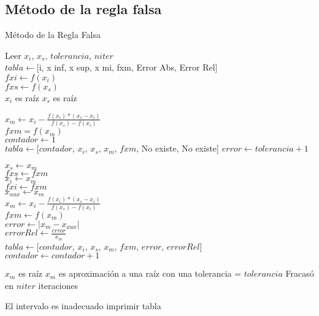 \documentclass[12pt]{article}
\begin{document}
\subsection{Método de la regla falsa}
\begin{algorithm}[H]
	\caption{Método de la Regla Falsa}
	\SetAlgoLined
	Leer $x_i$, $x_s$, $tolerancia$, $niter$ \\
	$tabla \leftarrow $[i, x inf, x sup, x mi, fxm, Error Abs, Error Rel] \\
	$fxi \leftarrow f(x_i)$ \\
	$fxs \leftarrow f(x_s)$ \\
	{$x_i$ es raíz}
	{$x_s$ es raíz}
	{
		$x_m \leftarrow x_i - \frac{f(x_i)*(x_s - x_i)}{f(x_s) - f(x_i)}$\\
		$fxm = f(x_m)$\\
		$contador \leftarrow 1$\\
		$tabla \leftarrow $[$contador$, $x_i$, $x_s$, $x_m$, $fxm$, No existe, No existe]
		$error \leftarrow tolerancia + 1$ \\
		{
			{$x_s \leftarrow x_m$\\
				$fxs \leftarrow fxm$\\}
			{$x_i \leftarrow x_m$\\
				$fxi \leftarrow fxm$\\}
			$x_{aux} \leftarrow x_m$\\
			$x_m \leftarrow x_i - \frac{f(x_i)*(x_s - x_i)}{f(x_s) - f(x_i)}$\\
			$fxm \leftarrow f(x_m)$\\
			$error \leftarrow |x_m - x_{aux}|$\\
			$error Rel \leftarrow \frac{error}{x_m}$\\
			$tabla \leftarrow $[$contador$, $x_i$, $x_s$, $x_m$, $fxm$, $error$, $error Rel$] \\
			$contador \leftarrow contador + 1$ 
			
			
		}
		{$x_m$ es raíz}
		{$x_m$ es aproximación a una raíz con una tolerancia = $tolerancia$}
		\Else
		{Fracasó en $niter$ iteraciones}
	}
	\Else
	{El intervalo es inadecuado}
	imprimir tabla
\end{algorithm}
\end{document}
